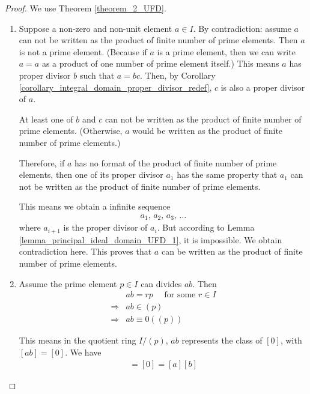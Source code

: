 \documentclass[utf8]{ctexbook}
\theoremstyle{definition}
\begin{document}
\begin{proof}
We use Theorem \ref{theorem_2_UFD}. 

\begin{enumerate}
\item{Suppose a non-zero and non-unit element $a \in I $. By contradiction: assume $a$ can not be written as the product of finite number of prime elements. Then $a$ is not a prime element. (Because if $a$ is a prime element, then we can write $a= a$ as a product of one number of prime element itself.) This means $a$ has proper divisor $b$ such that $a = bc$. Then, by Corollary \ref{corollary_integral_domain_proper_divisor_redef}, $c$ is also a proper divisor of $a$.

At least one of $b$ and $c$ can not be written as the product of finite number of prime elements. (Otherwise, $a$ would be written as the product of finite number of prime elements.)

Therefore, if $a$ has no format of the product of finite number of prime elements, then one of its proper divisor $a_1$ has the same property that $a_1$ can not be written as the product of finite number of prime elements.

This means we obtain a infinite sequence 
\begin{align*}
a_1, \, a_2, \, a_3, \, \ldots
\end{align*}
where $a_{i+1}$ is the proper divisor of $a_i$. But according to Lemma \ref{lemma_principal_ideal_domain_UFD_1}, it is impossible. We obtain contradiction here. This proves that $a$ can be written as the product of finite number of prime elements.
}
\item{Assume the prime element $p \in I$ can divides $ab$. Then
\begin{align*}
& ab = r p \quad \mbox{ for some } r \in I \\
\Longrightarrow & ab \in (p) \\
\Longrightarrow & ab \equiv 0 ( (p) )
\end{align*}

This means in the quotient ring $I/(p)$, $ab$ represents the class of $[0]$, with $[ab] = [0]$. We have
\begin{align*}
[ab] = [0] =[a][b]
\end{align*}

}
\end{enumerate}
\end{proof}
\end{document}
